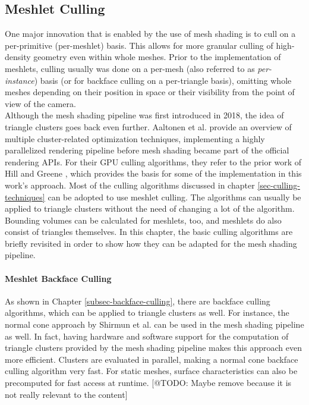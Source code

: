 \subsection*{Meshlet Culling} \label{subsec-meshlet-culling}

One major innovation that is enabled by the use of mesh shading is to cull on a per-primitive (per-meshlet) basis. 
This allows for more granular culling of high-density geometry even within whole meshes. Prior to the implementation 
of meshlets, culling usually was done on a per-mesh (also referred to as \emph{per-instance}) basis (or for backface 
culling on a per-triangle basis), omitting whole meshes depending on their position in space or their visibility from 
the point of view of the camera.\\

\noindent
Although the mesh shading pipeline was first introduced in 2018, the idea of triangle clusters goes back even further.
Aaltonen et al. \cite{Aaltonen2015} provide an overview of multiple cluster-related optimization techniques, implementing 
a highly parallelized rendering pipeline before mesh shading became part of the official rendering \ac{API}s.
For their \ac{GPU} culling algorithms, they refer to the prior work of Hill \cite{Hill11} and Greene \cite{Greene93}, which 
provides the basis for some of the implementation in this work's approach. Most of the culling algorithms discussed in chapter 
\ref{sec-culling-techniques} can be adopted to use meshlet culling. The algorithms can usually be applied to triangle clusters 
without the need of changing a lot of the algorithm. Bounding volumes can be calculated for meshlets, too, and meshlets do also 
consist of triangles themselves. In this chapter, the basic culling algorithms are briefly revisited in order to show how they 
can be adapted for the mesh shading pipeline.


\paragraph*{Meshlet Backface Culling} \label{subsubsec-meshlet-backface-culling}

As shown in Chapter \ref{subsec-backface-culling}, there are backface culling algorithms, which can be applied to 
triangle clusters as well. For instance, the normal cone approach by Shirmun et al. \cite{Shirmun1993} can be used 
in the mesh shading pipeline as well. In fact, having hardware and software support for the computation of triangle 
clusters provided by the mesh shading pipeline makes this approach even more efficient. Clusters are evaluated in 
parallel, making a normal cone backface culling algorithm very fast. For static meshes, surface characteristics can 
also be precomputed for fast access at runtime. [@TODO: Maybe remove because it is not really relevant to the content]


